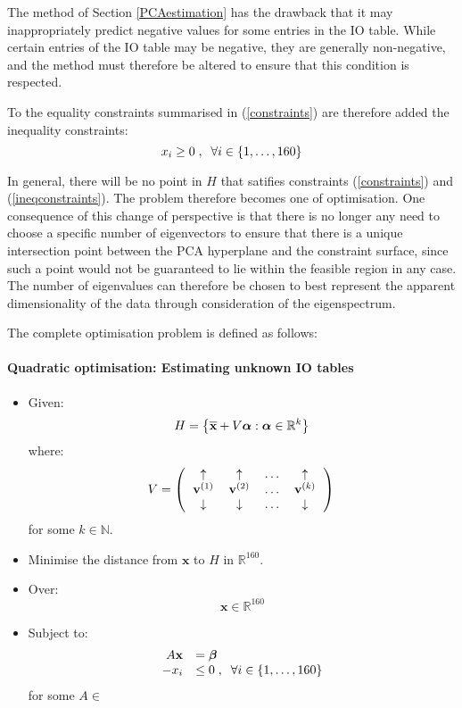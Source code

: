 \documentclass[preprint,authoryear,3p]{elsarticle}
\begin{document}
The method of Section \ref{PCAestimation} has the drawback that it may inappropriately predict negative values for some entries in the IO table. While certain entries of the IO table may be negative, they are generally non-negative, and the method must therefore be altered to ensure that this condition is respected.

To the equality constraints summarised in (\ref{constraints}) are therefore added the inequality constraints:
\begin{equation} \label{ineqconstraints}
x_{i} \geq 0 \; , \; \; \forall i \in \{ 1, \mathellipsis, 160 \}
\end{equation}

In general, there will be no point in $H$ that satifies constraints (\ref{constraints}) and (\ref{ineqconstraints}). The problem therefore becomes one of optimisation. One consequence of this change of perspective is that there is no longer any need to choose a specific number of eigenvectors to ensure that there is a unique intersection point between the PCA hyperplane and the constraint surface, since such a point would not be guaranteed to lie within the feasible region in any case. The number of eigenvalues can therefore be chosen to best represent the apparent dimensionality of the data through consideration of the eigenspectrum.

The complete optimisation problem is defined as follows:

\paragraph*{Quadratic optimisation: Estimating unknown IO tables}
\begin{itemize}
\item Given: $$ H = \left\{ \overline{\textbf{x}} + V \mbox{\boldmath$\alpha$} : \mbox{\boldmath$\alpha$} \in \mathbb{R}^{k} \right\} $$
where:
\begin{equation*}
V = \left(
\begin{tabular}{cccc}
$\uparrow$ & $\uparrow$ & $\mathellipsis$ & $\uparrow$\\
$\textbf{v}^{(1)}$ & $\textbf{v}^{(2)}$ & $\mathellipsis$ & $\textbf{v}^{(k)}$ \\
$\downarrow$ & $\downarrow$ & $\mathellipsis$ & $\downarrow$
\end{tabular} \right) \\
\end{equation*}
for some $k \in \mathbb{N}$.
\item Minimise the distance from $\textbf{x}$ to $H$ in $\mathbb{R}^{160}$.
\item Over: $$\textbf{x} \in \mathbb{R}^{160}$$
\item Subject to:
\begin{align*}
\begin{array}{rl}
A \textbf{x} & = \mbox{\boldmath$\beta$} \\
-x_{i} & \leq 0 \; , \; \; \forall i \in \{ 1, \mathellipsis, 160 \}
\end{array}
\end{align*}
for some $A \in $
\end{itemize}
\end{document}

